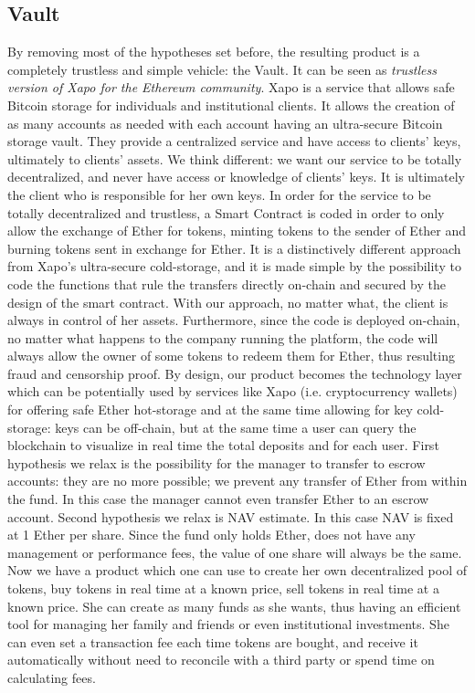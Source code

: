 \documentclass[9pt,oneside]{amsart}
\begin{document}
\begin{multicols}{2}
\section{Vault} \label{ch:minimum}
By removing most of the hypotheses set before, the resulting product is a completely trustless and simple vehicle: the Vault. It can be seen as  \textit{trustless version of Xapo for the Ethereum community}. 
Xapo is a service that allows safe Bitcoin storage for individuals and institutional clients. It allows the creation of as many accounts as needed with each account having an ultra-secure Bitcoin storage vault. They provide a centralized service and have access to clients' keys, ultimately to clients' assets.
We think different: we want our service to be totally decentralized, and never have access or knowledge of clients' keys. It is ultimately the client who is responsible for her own keys. In order for the service to be totally decentralized and trustless,  a Smart Contract is coded in order to only allow the exchange of Ether for tokens, minting tokens to the sender of Ether and burning tokens sent in exchange for Ether. It is a distinctively different approach from Xapo's ultra-secure cold-storage, and it is made simple by the possibility to code the functions that rule the transfers directly on-chain and secured by the design of the smart contract. With our approach, no matter what, the client is always in control of her assets. Furthermore, since the code is deployed on-chain, no matter what happens to the company running the platform, the code will always allow the owner of some tokens to redeem them for Ether, thus resulting fraud and censorship proof.
By design, our product becomes the technology layer which can be potentially used by services like Xapo (i.e. cryptocurrency wallets) for offering safe Ether hot-storage and at the same time allowing for key cold-storage: keys can be off-chain, but at the same time a user can query the blockchain to visualize in real time the total deposits and for each user. 
First hypothesis we relax is the possibility for the manager to transfer to escrow accounts: they are no more possible; we prevent any transfer of Ether from within the fund. In this case the manager cannot even transfer Ether to an escrow account.
Second hypothesis we relax is NAV estimate. In this case NAV is fixed at 1 Ether per share. Since the fund only holds Ether, does not have any management or performance fees, the value of one share will always be the same. Now we have a product which one can use to create her own decentralized pool of tokens, buy tokens in real time at a known price, sell tokens in real time at a known price. She can create as many funds as she wants, thus having an efficient tool for managing her family and friends or even institutional investments. She can even set a transaction fee each time tokens are bought, and receive it automatically without need to reconcile with a third party or spend time on calculating fees. 

\end{multicols}
\end{document}
